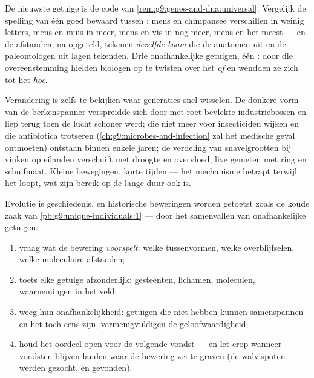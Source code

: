 \begin{proposition}\label{prop:g9:evidence-of-evolution:molecules}
De nieuwste getuige is de code van
\cref{rem:g9:genes-and-dna:universal}. Vergelijk de spelling van
één goed bewaard  tussen : mens en chimpansee
verschillen in weinig letters, mens en muis in meer, mens en vis
in nog meer, mens en  het meest --- en de afstanden,
 na  opgeteld, tekenen \emph{dezelfde boom} die de
anatomen uit  en de paleontologen uit lagen tekenden. Drie
onafhankelijke getuigen, één : door die overeenstemming
hielden biologen op te twisten over het \emph{of} en wendden ze
zich tot het \emph{hoe}.
\end{proposition}
\admitted

\begin{example}\label{ex:g9:evidence-of-evolution:live}
Verandering is zelfs te bekijken waar generaties snel wisselen. De
donkere vorm van de berkenspanner verspreidde zich door met roet
bevlekte industriebossen en liep terug toen de lucht schoner werd;
 die niet meer voor insecticiden wijken en  die
antibiotica trotseren
(\cref{ch:g9:microbes-and-infection} zal het medische geval
ontmoeten) ontstaan binnen enkele jaren; de verdeling van
snavelgrootten bij vinken op eilanden verschuift met droogte en
overvloed, live gemeten met ring en schuifmaat. Kleine bewegingen,
korte tijden --- het mechanisme betrapt terwijl het loopt, wat
zijn bereik op de lange duur ook is.
\end{example}

\begin{method}\label{met:g9:evidence-of-evolution:weigh}
Evolutie is geschiedenis, en historische beweringen worden getoetst
zoals de koude zaak van
\cref{pb:g9:unique-individuals:1} --- door het samenvallen van
onafhankelijke getuigen:
\begin{enumerate}
  \item vraag wat de bewering \emph{voorspelt}: welke
        tussenvormen, welke overblijfselen, welke moleculaire
        afstanden;
  \item toets elke getuige afzonderlijk: gesteenten, lichamen,
        moleculen, waarnemingen in het veld;
  \item weeg hun onafhankelijkheid: getuigen die niet hebben
        kunnen samenspannen en het toch eens zijn,
        vermenigvuldigen de geloofwaardigheid;
  \item houd het oordeel open voor de volgende vondst --- en let
        erop wanneer vondsten blijven landen waar de bewering zei
        te graven (de walvispoten werden gezocht, en gevonden).
\end{enumerate}
\end{method}

